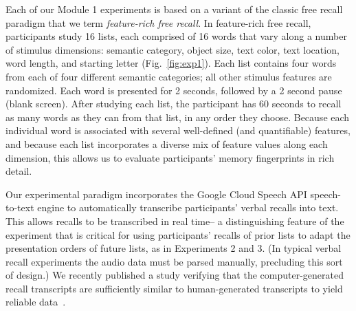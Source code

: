 Each of our Module 1 experiments is based on a variant of the classic free recall paradigm that we term \textit{feature-rich free recall}.   In feature-rich free recall, participants study 16 lists, each comprised of 16 words that vary along a number of stimulus dimensions: semantic category, object size, text color, text location, word length, and starting letter (Fig.~\ref{fig:exp1}). Each list contains four words from each of four different semantic categories; all other stimulus features are randomized.  Each word is presented for 2 seconds, followed by a 2 second pause (blank screen).  After studying each list, the participant has 60 seconds to recall as many words as they can from that list, in any order they choose.  Because each individual word is associated with several well-defined (and quantifiable) features, and because each list incorporates a diverse mix of feature values along each dimension, this allows us to evaluate participants' memory fingerprints in rich detail.

Our experimental paradigm incorporates the Google Cloud Speech API speech-to-text engine to automatically transcribe participants' verbal recalls into text.  This allows recalls to be transcribed in real time-- a distinguishing feature of the experiment that is critical for using participants' recalls of prior lists to adapt the presentation orders of future lists, as in Experiments 2 and 3.  (In typical verbal recall experiments the audio data must be parsed manually, precluding this sort of design.)  We recently published a study verifying that the computer-generated recall transcripts are sufficiently similar to human-generated transcripts to yield reliable data~\citep{ZimaEtal18}.

